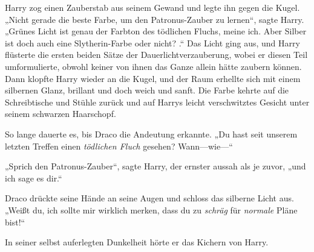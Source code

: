 Harry zog einen Zauberstab aus seinem Gewand und legte ihn gegen die Kugel. „Nicht gerade die beste Farbe, um den Patronus-Zauber zu lernen“, sagte Harry. „Grünes Licht ist genau der Farbton des tödlichen Fluchs, meine ich. Aber Silber ist doch auch eine Slytherin-Farbe oder nicht? .“ Das Licht ging aus, und Harry flüsterte die ersten beiden Sätze der Dauerlichtverzauberung, wobei er diesen Teil umformulierte, obwohl keiner von ihnen das Ganze allein hätte zaubern können. Dann klopfte Harry wieder an die Kugel, und der Raum erhellte sich mit einem silbernen Glanz, brillant und doch weich und sanft. Die Farbe kehrte auf die Schreibtische und Stühle zurück und auf Harrys leicht verschwitztes Gesicht unter seinem schwarzen Haarschopf.

So lange dauerte es, bis Draco die Andeutung erkannte. „Du hast seit unserem letzten Treffen einen \emph{tödlichen Fluch} gesehen? Wann—wie—“

„Sprich den Patronus-Zauber“, sagte Harry, der ernster aussah als je zuvor, „und ich sage es dir.“

Draco drückte seine Hände an seine Augen und schloss das silberne Licht aus. „Weißt du, ich sollte mir wirklich merken, dass du zu \emph{schräg} für \emph{normale} Pläne bist!“

In seiner selbst auferlegten Dunkelheit hörte er das Kichern von Harry.

